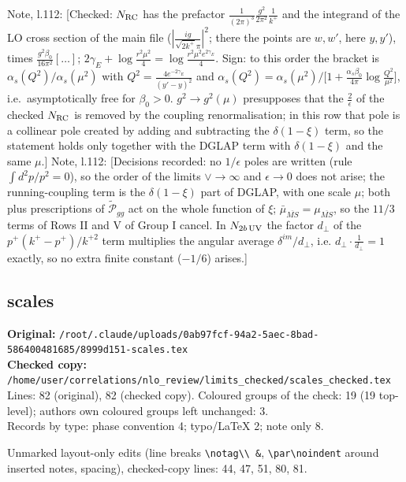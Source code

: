 \documentclass[10pt]{article}
\newenvironment{notebox}{\def\FrameCommand{{\color{notebar}\vrule width 1.5pt}\hspace{6pt}}\MakeFramed{\advance\hsize-\width\FrameRestore}\small}{\endMakeFramed}
\begin{document}
\begin{notebox}\textsf{\small Note, l.112:} [Checked: $N_{\rm RC}$ has the prefactor $\frac{1}{(2\pi)^{3}}\frac{g^{2}}{2\pi^{2}}\frac{1}{k^{+}}$ and the integrand of the LO cross section of the main file ($|\frac{ig}{\sqrt{2k^{+}}\pi}|^{2}$; there the points are $w,w'$, here $y,y'$), times $\frac{g^{2}\beta_{0}}{16\pi^{2}}[\dots]$; $2\gamma_{E}+\log\frac{r^{2}\mu^{2}}{4}=\log\frac{r^{2}\mu^{2}e^{2\gamma_{E}}}{4}$. Sign: to this order the bracket is $\alpha_{s}(Q^{2})/\alpha_{s}(\mu^{2})$ with $Q^{2}=\frac{4e^{-2\gamma_{E}}}{(y'-y)^{2}}$ and $\alpha_{s}(Q^{2})=\alpha_{s}(\mu^{2})\big/\big[1+\frac{\alpha_{s}\beta_{0}}{4\pi}\log\frac{Q^{2}}{\mu^{2}}\big]$, i.e.\ asymptotically free for $\beta_{0}>0$. $g^{2}\to g^{2}(\mu)$ presupposes that the $\frac{2}{\epsilon}$ of the checked $N_{\rm RC}$ is removed by the coupling renormalisation; in this row that pole is a collinear pole created by adding and subtracting the $\delta(1-\xi)$ term, so the statement holds only together with the DGLAP term with $\delta(1-\xi)$ and the same $\mu$.]\end{notebox}
\begin{notebox}\textsf{\small Note, l.112:} [Decisions recorded: no $1/\epsilon$ poles are written (rule $\int d^{2}p/p^{2}=0$), so the order of the limits $\vee\to\infty$ and $\epsilon\to0$ does not arise; the running-coupling term is the $\delta(1-\xi)$ part of DGLAP, with one scale $\mu$; both plus prescriptions of $\widetilde{\mathcal{P}}_{gg}$ act on the whole function of $\xi$; $\bar\mu_{\overline{MS}}=\mu_{\overline{MS}}$, so the $11/3$ terms of Rows II and V of Group I cancel. In $N_{2b\,\rm UV}$ the factor $d_{\perp}$ of the $p^{+}(k^{+}-p^{+})/k^{+2}$ term multiplies the angular average $\delta^{im}/d_{\perp}$, i.e. $d_{\perp}\cdot\frac{1}{d_{\perp}}=1$ exactly, so no extra finite constant ($-1/6$) arises.]\end{notebox}
\bigskip
\subsection{scales}\label{sec:file-scales}
\noindent\textbf{Original:} \texttt{/root/.claude/uploads/0ab97fcf-94a2-5aec-8bad-586400481685/8999d151-scales.tex}\\\textbf{Checked copy:} \texttt{/home/user/correlations/nlo\_review/limits\_checked/scales\_checked.tex}\\
Lines: 82 (original), 82 (checked copy). Coloured groups of the check: 19 (19 top-level); author\textquotesingle s own coloured groups left unchanged: 3.\\
Records by type: phase convention 4; typo/LaTeX 2; note only 8.
\par\noindent Unmarked layout-only edits (line breaks \texttt{\textbackslash notag\textbackslash\textbackslash\ \&}, \texttt{\textbackslash par\textbackslash noindent} around inserted notes, spacing), checked-copy lines: 44, 47, 51, 80, 81.
\end{document}
